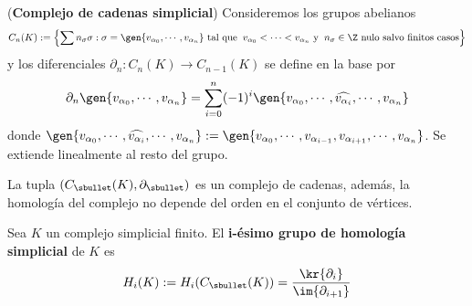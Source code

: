 \documentclass{article}
\begin{document}
\vspace{2mm}
\begin{dfn}
    (\textbf{Complejo de cadenas simplicial}) Consideremos los grupos abelianos
    \begin{equation*}
        C_{n}(K):=\left\{\sum n_{\sigma}\sigma:\sigma=\gen{v_{\alpha_{0}},\cdots,v_{\alpha_{n}}}
        \text{ tal que}\hspace{2mm}v_{\alpha_{0}}<\cdots<v_{\alpha_{n}}
        \text{ y}\hspace{2mm}n_{\sigma}\in\Z
        \text{ nulo salvo finitos casos}\right\}
    \end{equation*}
    y los diferenciales $\partial_{n}:C_{n}(K)\to C_{n-1}(K)$ se define en la base por
    \begin{equation*}
        \partial_{n}\gen{v_{\alpha_{0}},\cdots,v_{\alpha_{n}}}
        =\sum_{i=0}^{n}(-1)^{i}\gen{v_{\alpha_{0}},\cdots,\widehat{v_{\alpha_{i}}},
        \cdots,v_{\alpha_{n}}}
    \end{equation*}
    donde $\gen{v_{\alpha_{0}},\cdots,\widehat{v_{\alpha_{i}}},\cdots,v_{\alpha_{n}}}:=
    \gen{v_{\alpha_{0}},\cdots,v_{\alpha_{i-1}},v_{\alpha_{i+1}},\cdots,v_{\alpha_{n}}}$. Se 
    extiende linealmente al resto del grupo.
\end{dfn}

\vspace{2mm}
\begin{teo}
    La tupla $(C_{\sbullet}(K),\partial_{\sbullet})$ es un complejo de cadenas, además, la 
    homología del complejo no depende del orden en el conjunto de vértices.
\end{teo}

\vspace{2mm}
\begin{dfn}
    Sea $K$ un complejo simplicial finito. El \textbf{i-ésimo grupo de homología simplicial} de 
    $K$ es
    \begin{equation*}
        H_{i}(K):=H_{i}(C_{\sbullet}(K))=\frac{\kr{\partial_{i}}}{\im{\partial_{i+1}}}
    \end{equation*}
\end{dfn}
\end{document}
